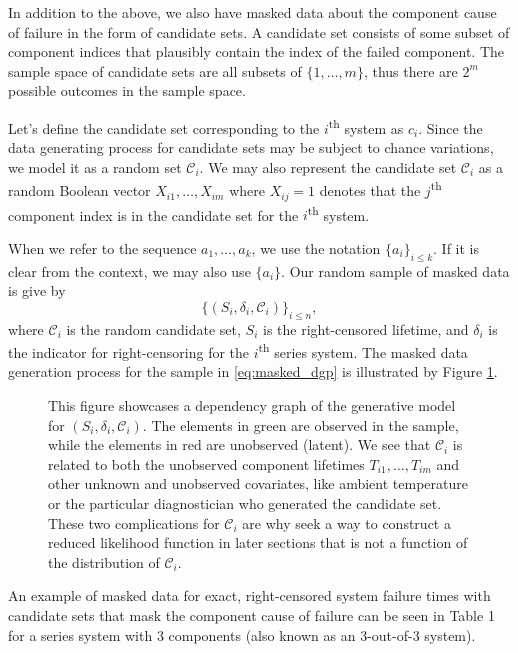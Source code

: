 \documentclass[
]{article}
\begin{document}
In addition to the above, we also have masked data about the component
cause of failure in the form of candidate sets. A candidate set consists
of some subset of component indices that plausibly contain the index of
the failed component. The sample space of candidate sets are all subsets
of \(\{1,\ldots,m\}\), thus there are \(2^m\) possible outcomes in the
sample space.

Let's define the candidate set corresponding to the
\(i\)\textsuperscript{th} system as \(c_i\). Since the data generating
process for candidate sets may be subject to chance variations, we model
it as a random set \(\mathcal{C}_i\). We may also represent the
candidate set \(\mathcal{C}_i\) as a random Boolean vector
\(X_{i 1},\ldots,X_{i m}\) where \(X_{i j}=1\) denotes that the
\(j\)\textsuperscript{th} component index is in the candidate set for
the \(i\)\textsuperscript{th} system.

When we refer to the sequence \(a_1,\ldots,a_k\), we use the notation
\(\{a_i\}_{i \leq k}\). If it is clear from the context, we may also use
\(\{a_i\}\). Our random sample of masked data is give by
\begin{equation}
\label{eq:masked_dgp}
    \{(S_i,\delta_i,\mathcal{C}_i)\}_{i \leq n},
\end{equation} where \(\mathcal{C}_i\) is the random candidate set,
\(S_i\) is the right-censored lifetime, and \(\delta_i\) is the
indicator for right-censoring for the \(i\)\textsuperscript{th} series
system. The masked data generation process for the sample in
\eqref{eq:masked_dgp} is illustrated by Figure \ref{fig:figureone}.

\begin{figure}[h]
\centering{
\resizebox{0.5\textwidth}{!}{}}
\caption{This figure showcases a dependency graph of the generative model for
$(S_i,\delta_i,\mathcal{C}_i)$. The elements in green are observed in the sample,
while the elements in red are unobserved (latent). We see that $\mathcal{C}_i$ is
related to both the unobserved component lifetimes $T_{i 1},\ldots,T_{i m}$ and
other unknown and unobserved covariates, like ambient temperature or the
particular diagnostician who generated the candidate set. These two complications
for $\mathcal{C}_i$ are why seek a way to construct a reduced likelihood function
in later sections that is not a function of the distribution of $\mathcal{C}_i$.}
\label{fig:figureone}
\end{figure}

An example of masked data for exact, right-censored system failure times
with candidate sets that mask the component cause of failure can be seen
in Table 1 for a series system with \(3\) components (also known as an
\(3\)-out-of-\(3\) system).
\end{document}
